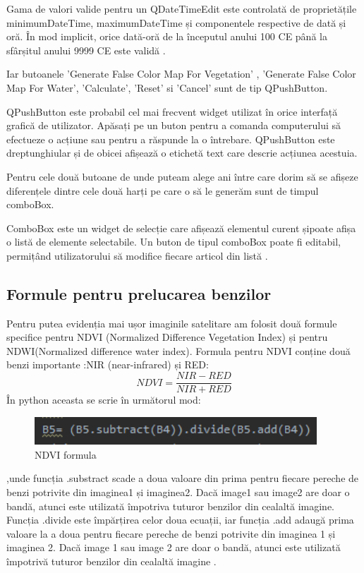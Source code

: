 \documentclass[12pt,a4paper]{article}
\theoremstyle{definition}
\theoremstyle{remark}
\begin{document}
Gama de valori valide pentru un QDateTimeEdit este controlată de proprietățile minimumDateTime, maximumDateTime și componentele respective de dată și oră. În mod implicit, orice dată-oră de la începutul anului 100 CE până la sfârșitul anului 9999 CE este validă \cite{date}.

Iar butoanele 'Generate False Color Map For Vegetation' , 'Generate False Color Map For Water', 'Calculate', 'Reset' si 'Cancel' sunt de tip QPushButton.

QPushButton este probabil cel mai frecvent widget utilizat în orice interfață grafică de utilizator. Apăsați pe un buton pentru a comanda computerului să efectueze o acțiune sau pentru a răspunde la o întrebare. 
QPushButton este dreptunghiular și de obicei afișează o etichetă text care descrie acțiunea acestuia.\cite{generare}

Pentru cele două butoane de unde puteam alege ani între care dorim să se afișeze diferențele dintre cele două harți pe care o să le generăm sunt de timpul comboBox.

ComboBox este un widget de selecție care afișează elementul curent șipoate afișa o listă de elemente selectabile. Un buton de tipul comboBox poate fi editabil, permițând utilizatorului să modifice fiecare articol din listă \cite{combo}.

\subsection{Formule pentru prelucarea benzilor}
Pentru putea evidenția mai ușor imaginile satelitare am folosit două formule specifice pentru NDVI (Normalized Difference Vegetation Index) și pentru NDWI(Normalized difference water index).
    Formula pentru NDVI conține două benzi importante :NIR (near-infrared) și  RED:
    $$ NDVI = \frac{NIR-RED}{NIR+RED} $$
   În python aceasta se scrie în următorul mod:
    \begin{figure}[H]
  \centering
  \includegraphics[width=300pt]{ndvi.PNG}
  \caption{NDVI formula}   
\end{figure}

    ,unde funcția .substract scade a doua valoare din prima pentru fiecare pereche de benzi potrivite din imaginea1 și imaginea2. Dacă image1 sau image2 are doar o bandă, atunci este utilizată împotriva tuturor benzilor din cealaltă imagine. Funcția .divide este împărțirea celor doua ecuații, iar funcția .add adaugă prima valoare la a doua pentru fiecare pereche de benzi potrivite din imaginea 1 și imaginea 2. Dacă image 1 sau image 2 are doar o bandă, atunci este utilizată împotrivă tuturor benzilor din cealaltă imagine \cite{formula}.
    
\end{document}
